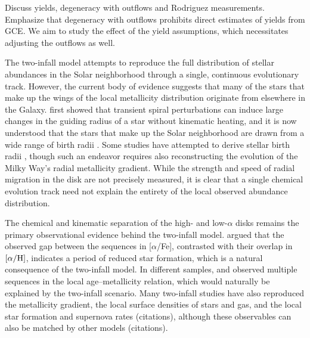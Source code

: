 \documentclass[twocolumn,twocolappendix,linenumbers]{aastex631}
\newcommand{\todo}[1]{{\color{red}#1}}
\newcommand{\aFe}{[$\alpha$/Fe]\xspace}
\begin{document}
\todo{Discuss yields, degeneracy with outflows and Rodriguez measurements. Emphasize that degeneracy with outflows prohibits direct estimates of yields from GCE. We aim to study the effect of the yield assumptions, which necessitates adjusting the outflows as well.}

The two-infall model attempts to reproduce the full distribution of stellar abundances in the Solar neighborhood through a single, continuous evolutionary track. However, the current body of evidence suggests that many of the stars that make up the wings of the local metallicity distribution originate from elsewhere in the Galaxy. \citet{sellwood_radial_2002} first showed that transient spiral perturbations can induce large changes in the guiding radius of a star without kinematic heating, and it is now understood that the stars that make up the Solar neighborhood are drawn from a wide range of birth radii \citep[e.g.,][]{schonrich_chemical_2009,frankel_measuring_2018,lehmann_probing_2024}. Some studies have attempted to derive stellar birth radii \citep[e.g.,][]{ratcliffe_unveiling_2023,lu_there_2024}, though such an endeavor requires also reconstructing the evolution of the Milky Way's radial metallicity gradient. While the strength and speed of radial migration in the disk are not precisely measured, it is clear that a single chemical evolution track need not explain the entirety of the local observed abundance distribution.

The chemical and kinematic separation of the high- and low-$\alpha$ disks remains the primary observational evidence behind the two-infall model. \citet{spitoni_remind_2024} argued that the observed gap between the sequences in \aFe, contrasted with their overlap in $[\alpha/{\rm H}]$, indicates a period of reduced star formation, which is a natural consequence of the two-infall model. In different samples, \citet{nissen_high-precision_2020} and \citet{nataf_accurate_2024} observed multiple sequences in the local age--metallicity relation, which would naturally be explained by the two-infall scenario. Many two-infall studies have also reproduced the metallicity gradient, the local surface densities of stars and gas, and the local star formation and supernova rates \todo{(citations)}, although these observables can also be matched by other models \todo{(citations)}.
\end{document}
